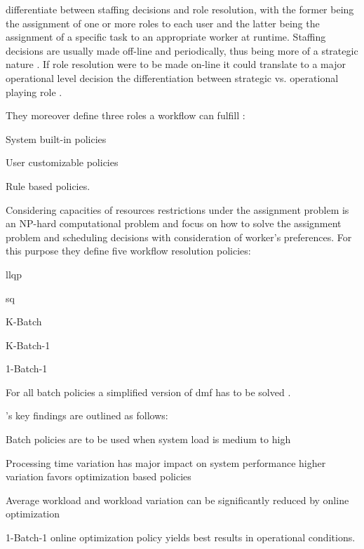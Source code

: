 \documentclass[draft=false]{seal_thesis}
\begin{document}
\citet{Zeng2005} differentiate between staffing decisions and role resolution, with the former being the assignment of one or more roles to each user and the latter being the assignment of a specific task to an appropriate worker at runtime. Staffing decisions are usually made off-line and periodically, thus being more of a strategic nature \citep{Zeng2005}. If role resolution were to be made on-line it could translate to a major operational level decision \ie the differentiation between strategic vs. operational playing role \citep{Zeng2005}.

They moreover define three roles a workflow can fulfill \citep{Zeng2005}:
\begin{enumerate*}
	\item System built-in policies
	\item User customizable policies
	\item Rule based policies.
\end{enumerate*}

Considering capacities of resources restrictions under the assignment problem is an NP-hard computational problem and \citet{Zeng2005} focus on how to solve the assignment problem and scheduling decisions with consideration of worker's preferences. For this purpose they define five workflow resolution policies:
\begin{enumerate*}
	\item \gls{llqp}
	\item \gls{sq}
	\item K-Batch
	\item K-Batch-1
	\item 1-Batch-1
\end{enumerate*}

For all batch policies a simplified version of \gls{dmf} has to be solved \citep{Zeng2005}.

\citet{Zeng2005}'s key findings are outlined as follows:
\begin{enumerate*}
	\item Batch policies are to be used when system load is medium to high
	\item Processing time variation has major impact on system performance \ie higher variation favors optimization based policies
	\item Average workload and workload variation can be significantly reduced by online optimization
	\item 1-Batch-1 online optimization policy yields best results in operational conditions.
\end{enumerate*}
\end{document}
